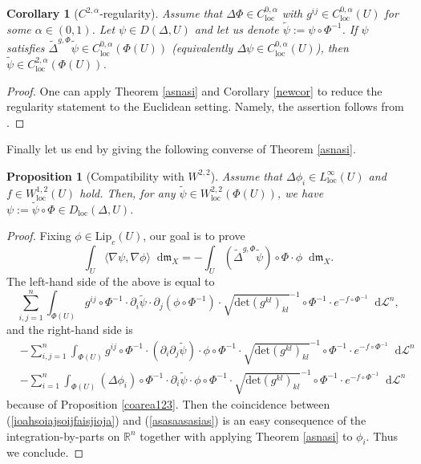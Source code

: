 \documentclass[11pt,reqno]{amsart}
\newtheorem{corollary}[theorem]{Corollary}
\newtheorem{proposition}[theorem]{Proposition}
\theoremstyle{definition}
\numberwithin{equation}{section}
\newcommand{\di}{\mathop{}\!\mathrm{d}}
\newcommand{\meas}{\mathfrak{m}}
\DeclareMathOperator{\loc}{loc}
\begin{document}
\begin{corollary}[$C^{2,\alpha}$-regularity]\label{calp} Assume that  $\Delta \Phi \in C^{0,\alpha}_{\loc}$ with $g^{ij} \in C^{0,\alpha}_{\loc}(U)$ for some $\alpha \in (0,1)$.
 Let $\psi \in D(\Delta, U)$ and let us denote $\tilde{\psi} := \psi \circ \Phi^{-1}$. 
If $\psi$ satisfies $\widetilde{\Delta}^{g, \Phi} \tilde{\psi}  \in C^{0,\alpha}_{\loc}( \Phi(U) )$ (equivalently $\Delta \psi \in C^{0,\alpha}_{\loc}(U)$), then $\tilde{\psi} \in C^{2, \alpha}_{\loc} ( \Phi( U ) )$.
\end{corollary}
\begin{proof}   One can apply Theorem \ref{asnasi} and Corollary \ref{newcor} to reduce the regularity statement to the Euclidean setting. Namely, the assertion  
follows from  \cite[Theorem 9.19]{GT}. 
\end{proof}
Finally let us end by giving the following converse of Theorem \ref{asnasi}.
\begin{proposition}[Compatibility with $W^{2,2}$]\label{toCZ}
    Assume that $\Delta \phi_i \in L^{\infty}_{\loc}(U)$ and $f \in W^{1,2}_{\loc}(U)$ hold. Then, for any $\tilde \psi \in W^{2,2}_{\loc}(\Phi(U))$, we have $\psi := \tilde \psi \circ \Phi \in D_{\loc}(\Delta, U)$.
\end{proposition}
\begin{proof}
    Fixing $\phi \in \mathrm{Lip}_c(U)$, our goal is to prove
    \begin{equation}\label{66ebbbsjjssx}
        \int_U\langle \nabla \psi, \nabla \phi\rangle \di \meas_X=-\int_U(\tilde \Delta^{g, \Phi}\tilde \psi)\circ \Phi \cdot \phi\di \meas_X.
    \end{equation}
    The left-hand side of the above is equal to
    \begin{equation}\label{ioahsoiajsoijfaisjioja}
        \sum_{i, j=1}^n\int_{\Phi(U)}g^{ij}\circ \Phi^{-1} \cdot \partial_i\tilde{\psi}\cdot \partial_j (\phi \circ \Phi^{-1} ) \cdot \sqrt{\mathrm{det}(g^{kl})_{kl}}^{-1} \circ\Phi^{-1} \cdot e^{-f\circ \Phi^{-1}}\di \mathcal{L}^n,
    \end{equation}
    and the right-hand side is
    \begin{align}\label{asasaasasias}
        &-\sum_{i, j=1}^n\int_{\Phi(U)}g^{ij}\circ \Phi^{-1}\cdot (\partial_i\partial_j\tilde \psi) \cdot \phi\circ \Phi^{-1}\cdot\sqrt{\mathrm{det}(g^{kl})_{kl}}^{-1} \circ\Phi^{-1} \cdot e^{-f\circ \Phi^{-1}}\di \mathcal{L}^n \nonumber \\
        &-\sum_{i=1}^n\int_{\Phi(U)}(\Delta \phi_i)\circ \Phi^{-1}\cdot \partial_i\tilde \psi \cdot \phi\circ \Phi^{-1}\cdot \sqrt{\mathrm{det}(g^{kl})_{kl}}^{-1} \circ\Phi^{-1} \cdot e^{-f\circ \Phi^{-1}}\di \mathcal{L}^n
    \end{align}
    because of Proposition \ref{coarea123}. Then the coincidence between (\ref{ioahsoiajsoijfaisjioja}) and (\ref{asasaasasias}) is an easy consequence of the integration-by-parts on $\mathbb{R}^n$ together with applying Theorem \ref{asnasi} to $\phi_i$. Thus we conclude.
\end{proof}
\end{document}

